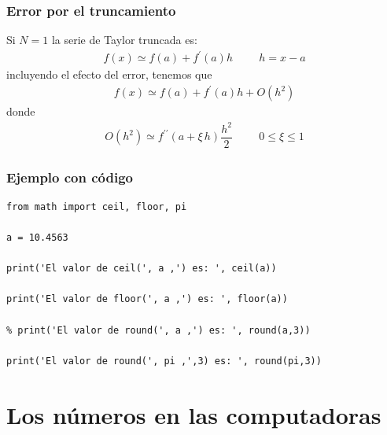 \begin{frame}
\frametitle{Error por el truncamiento}
Si $N=1$ la serie de Taylor truncada es:
\begin{align*}
f(x) \simeq f(a) + f^{\prime} (a) h \hspace{1cm} h=x-a
\end{align*}
incluyendo el efecto del error, tenemos que
\begin{align*}
f(x) \simeq f(a) + f^{\prime}(a) h + O(h^{2})
\end{align*}
donde
\begin{align*}
O(h^{2}) \simeq f^{\prime \prime}(a + \xi \, h) \dfrac{h^{2}}{2} \hspace{1cm} 0 \leq \xi \leq 1
\end{align*}
\end{frame}
\begin{frame}
\frametitle{Ejemplo con código}
\begin{lstlisting}[style=codigopython]
from math import ceil, floor, pi

a = 10.4563

print('El valor de ceil(', a ,') es: ', ceil(a))

print('El valor de floor(', a ,') es: ', floor(a))

% print('El valor de round(', a ,') es: ', round(a,3))

print('El valor de round(', pi ,',3) es: ', round(pi,3))
\end{lstlisting}
\end{frame}
\section{Los números en las computadoras}
